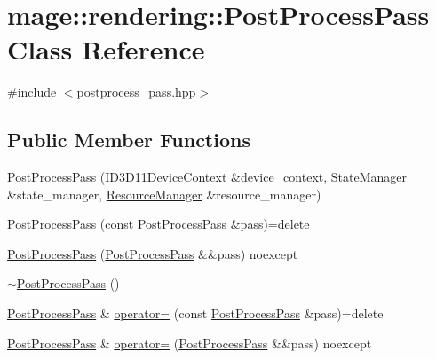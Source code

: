 \hypertarget{classmage_1_1rendering_1_1_post_process_pass}{}\section{mage\+:\+:rendering\+:\+:Post\+Process\+Pass Class Reference}
\label{classmage_1_1rendering_1_1_post_process_pass}


{\ttfamily \#include $<$postprocess\+\_\+pass.\+hpp$>$}

\subsection*{Public Member Functions}
\begin{DoxyCompactItemize}
\item 
\mbox{\hyperlink{classmage_1_1rendering_1_1_post_process_pass_aa7989cc618c40d64e6e86f1aa8576dff}{Post\+Process\+Pass}} (I\+D3\+D11\+Device\+Context \&device\+\_\+context, \mbox{\hyperlink{classmage_1_1rendering_1_1_state_manager}{State\+Manager}} \&state\+\_\+manager, \mbox{\hyperlink{classmage_1_1rendering_1_1_resource_manager}{Resource\+Manager}} \&resource\+\_\+manager)
\item 
\mbox{\hyperlink{classmage_1_1rendering_1_1_post_process_pass_a5980123845352eb3071e2fde203469fc}{Post\+Process\+Pass}} (const \mbox{\hyperlink{classmage_1_1rendering_1_1_post_process_pass}{Post\+Process\+Pass}} \&pass)=delete
\item 
\mbox{\hyperlink{classmage_1_1rendering_1_1_post_process_pass_aa57a8a38643fc76d0cdae8106c3de7e3}{Post\+Process\+Pass}} (\mbox{\hyperlink{classmage_1_1rendering_1_1_post_process_pass}{Post\+Process\+Pass}} \&\&pass) noexcept
\item 
\mbox{\hyperlink{classmage_1_1rendering_1_1_post_process_pass_a41e82fe23fdc3a5726989edb0bb334ea}{$\sim$\+Post\+Process\+Pass}} ()
\item 
\mbox{\hyperlink{classmage_1_1rendering_1_1_post_process_pass}{Post\+Process\+Pass}} \& \mbox{\hyperlink{classmage_1_1rendering_1_1_post_process_pass_ace844a6fbc47cc0470642e48361efacd}{operator=}} (const \mbox{\hyperlink{classmage_1_1rendering_1_1_post_process_pass}{Post\+Process\+Pass}} \&pass)=delete
\item 
\mbox{\hyperlink{classmage_1_1rendering_1_1_post_process_pass}{Post\+Process\+Pass}} \& \mbox{\hyperlink{classmage_1_1rendering_1_1_post_process_pass_a72e638460796e9613f232a6cbf118378}{operator=}} (\mbox{\hyperlink{classmage_1_1rendering_1_1_post_process_pass}{Post\+Process\+Pass}} \&\&pass) noexcept

\end{DoxyCompactItemize}
